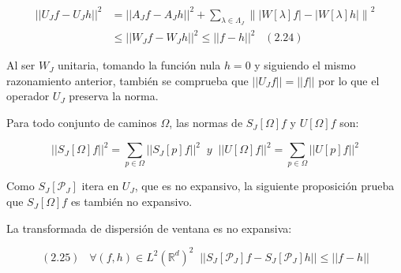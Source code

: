 \begin{align*} 
    ||U_J f-U_J h||^2 &= ||A_J f-A_J h||^2+\sum_{\lambda\in\Lambda_J} \left\| |W[\lambda]f|-|W[\lambda]h| \right\|^2 \\
    &\leq \left| \left| W_J f- W_J h \right| \right|^2 \leq ||f-h||^2 \;\;\; (2.24)
\end{align*}

\noindent Al ser $W_J$ unitaria, tomando la función nula $h=0$ y siguiendo el mismo razonamiento anterior, también se comprueba que $||U_J f||=||f||$ por lo que el operador $U_J$ preserva la norma.

\medskip

\noindent Para todo conjunto de caminos $\Omega$, las normas de $S_J[\Omega]f$ y $U[\Omega]f$ son: 

$$\left|\left| S_J[\Omega]f \right|\right|^2=\sum_{p\in\Omega} \left|\left| S_J[p]f\right|\right|^2 \;\; y \;\; \left|\left|U[\Omega]f\right|\right|^2=\sum_{p\in\Omega} \left|\left| U[p]f\right|\right|^2$$

\noindent Como $S_J[\mathcal{P}_J]$ itera en $U_J$, que es no expansivo, la siguiente proposición prueba que $S_J[\Omega]f$ es también no expansivo. 

\begin{proposicion} \label{proposicion::NoExpansiva}
La transformada de dispersión de ventana es no expansiva: 

$$(2.25) \;\;\; \forall (f,h)\in L^2(\mathbb{R}^d)^2 \;\; ||S_J[\mathcal{P}_J]f-S_J[\mathcal{P}_J]h|| \leq ||f-h||$$
\end{proposicion}

